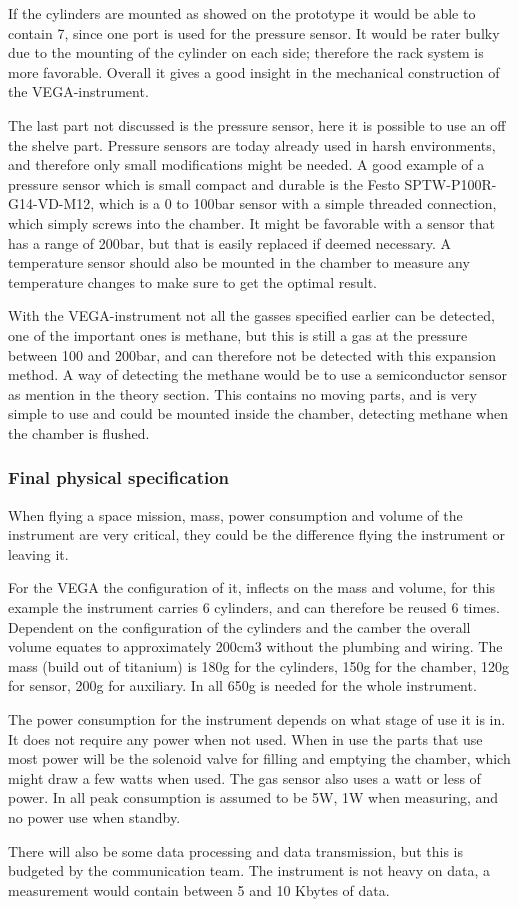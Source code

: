 \documentclass[10pt,a4paper,draft]{report}
\begin{document}
If the cylinders are mounted as showed on the prototype it would be able to contain 7, since one port is used for the pressure sensor. It would be rater bulky due to the mounting of the cylinder on each side; therefore the rack system is more favorable. Overall it gives a good insight in the mechanical construction of the VEGA-instrument.\par
The last part not discussed is the pressure sensor, here it is possible to use an off the shelve part. Pressure sensors are today already used in harsh environments, and therefore only small modifications might be needed. A good example of a pressure sensor which is small compact and durable is the Festo SPTW-P100R-G14-VD-M12, which is a 0 to 100bar sensor with a simple threaded connection, which simply screws into the chamber. It might be favorable with a sensor that has a range of 200bar, but that is easily replaced if deemed necessary. A temperature sensor should also be mounted in the chamber to measure any temperature changes to make sure to get the optimal result.\par 
With the VEGA-instrument not all the gasses specified earlier can be detected, one of the important ones is methane, but this is still a gas at the pressure between 100 and 200bar, and can therefore not be detected with this expansion method. A way of detecting the methane would be to use a semiconductor sensor as mention in the theory section. This contains no moving parts, and is very simple to use and could be mounted inside the chamber, detecting methane when the chamber is flushed.\par


\subsubsection{Final physical specification}
When flying a space mission, mass, power consumption and volume of the instrument are very critical, they could be the difference flying the instrument or leaving it.\par
For the VEGA the configuration of it, inflects on the mass and volume, for this example the instrument carries 6 cylinders, and can therefore be reused 6 times. Dependent on the configuration of the cylinders and the camber the overall volume equates to approximately 200cm3 without the plumbing and wiring. The mass (build out of titanium) is 180g for the cylinders, 150g for the chamber, 120g for sensor, 200g for auxiliary. In all 650g is needed for the whole instrument. \par
The power consumption for the instrument depends on what stage of use it is in. It does not require any power when not used. When in use the parts that use most power will be the solenoid valve for filling and emptying the chamber, which might draw a few watts when used. The gas sensor also uses a watt or less of power. In all peak consumption is assumed to be 5W, 1W when measuring, and no power use when standby. \par 
There will also be some data processing and data transmission, but this is budgeted by the communication team. The instrument is not heavy on data, a measurement would contain between 5 and 10 Kbytes of data. \par
\end{document}

